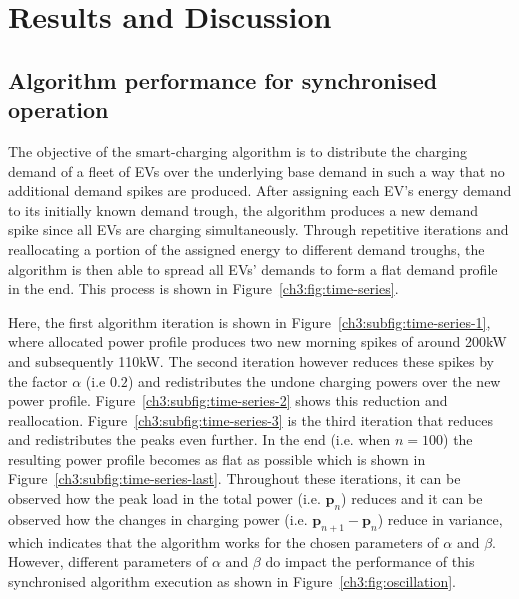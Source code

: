 \section{Results and Discussion}
\label{ch3:sec:results}

\subsection{Algorithm performance for synchronised operation}
\label{ch3:subsec:algorithm-performance-synchronised}

The objective of the smart-charging algorithm is to distribute the charging demand of a fleet of EVs over the underlying base demand in such a way that no additional demand spikes are produced.
After assigning each EV's energy demand to its initially known demand trough, the algorithm produces a new demand spike since all EVs are charging simultaneously.
Through repetitive iterations and reallocating a portion of the assigned energy to different demand troughs, the algorithm is then able to spread all EVs' demands to form a flat demand profile in the end.
This process is shown in Figure~\ref{ch3:fig:time-series}.



Here, the first algorithm iteration is shown in Figure~\ref{ch3:subfig:time-series-1}, where allocated power profile produces two new morning spikes of around 200kW and subsequently 110kW.
The second iteration however reduces these spikes by the factor $\alpha$ (i.e $0.2$) and redistributes the undone charging powers over the new power profile.
Figure~\ref{ch3:subfig:time-series-2} shows this reduction and reallocation.
Figure~\ref{ch3:subfig:time-series-3} is the third iteration that reduces and redistributes the peaks even further.
In the end (i.e. when $n=100$) the resulting power profile becomes as flat as possible which is shown in Figure~\ref{ch3:subfig:time-series-last}.
Throughout these iterations, it can be observed how the peak load in the total power (i.e. $\textbf{p}_n$) reduces and it can be observed how the changes in charging power (i.e. $\textbf{p}_{n+1}-\textbf{p}_n$) reduce in variance, which indicates that the algorithm works for the chosen parameters of $\alpha$ and $\beta$.
However, different parameters of $\alpha$ and $\beta$ do impact the performance of this synchronised algorithm execution as shown in Figure~\ref{ch3:fig:oscillation}.



